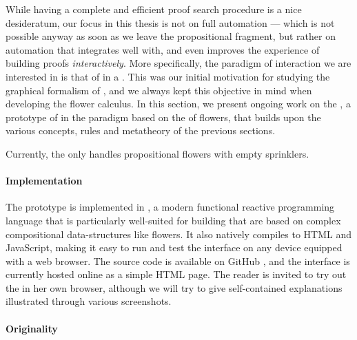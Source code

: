 \begin{scope}
While having a complete and efficient proof search procedure is a nice
desideratum, our focus in this thesis is not on full automation --- which is not
possible anyway as soon as we leave the propositional fragment, but rather on
automation that integrates well with, and even improves the experience of
building proofs \emph{interactively}. More specifically, the paradigm of
interaction we are interested in is that of \emph{} in a
. This was our initial motivation for studying the graphical formalism
of , and we always kept this objective in mind when developing the
flower calculus. In this section, we present ongoing work on the , a prototype of  in the  paradigm based on
the  of flowers, that builds upon the various concepts,
rules and metatheory of the previous sections.

\begin{remark}
Currently, the  only handles propositional flowers with empty
sprinklers.
\end{remark}

\paragraph{Implementation}

The prototype is implemented in  ,
a modern functional reactive programming language that is particularly
well-suited for building  that are based on complex compositional
data-structures like flowers. It also natively compiles to HTML and JavaScript,
making it easy to run and test the interface on any device equipped with a web
browser. The source code is available on GitHub \cite{flower-prover}, and the
interface is currently hosted online as a simple HTML
page.
The reader is invited to try out the  in her own browser, although
we will try to give self-contained explanations illustrated through various
screenshots.

\paragraph{Originality}


\end{scope}
